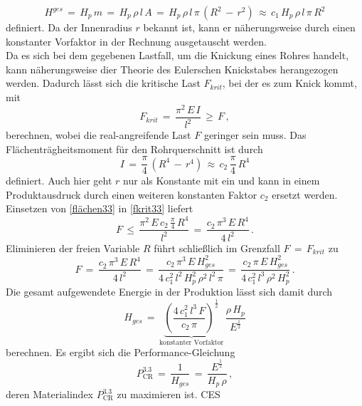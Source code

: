 \begin{equation}\label{energie33}
H^{ges}\,=\,H_p\,m\,=\,H_p\,\rho\,l\,A\,=\,H_p\,\rho\,l\,\pi\,\left(R^2\,-\,r^2\right)\,\approx\,c_1\,H_p\,\rho\,l\,\pi\,R^2
\end{equation}
definiert. Da der Innenradius $r$ bekannt ist, kann er näherungsweise durch einen konstanter Vorfaktor in der Rechnung ausgetauscht werden.\\
Da es sich bei dem gegebenen Lastfall, um die Knickung eines Rohres handelt, kann näherungsweise dier Theorie des Eulerschen Knickstabes herangezogen werden. Dadurch lässt sich die kritische Last $F_{krit}$, bei der es zum Knick kommt, mit
\begin{equation}\label{fkrit33}
F_{krit}\,=\,\frac{\pi^2\,E\,I}{l^2}\,\ge\,F\,,
\end{equation}
berechnen, wobei die real-angreifende Last $F$ geringer sein muss.
Das Flächenträgheitsmoment für den Rohrquerschnitt ist durch
\begin{equation}\label{flächen33}
I\,=\,\frac{\pi}{4}\,\left(R^4\,-\,r^4\right)\,\approx\,c_2\,\frac{\pi}{4}\,R^4
\end{equation}
definiert. Auch hier geht $r$ nur als Konstante mit ein und kann in einem Produktausdruck durch einen weiteren konstanten Faktor $c_2$ ersetzt werden. Einsetzen von \ref{flächen33} in \ref{fkrit33} liefert
\begin{equation}
F\,\le\,\frac{\pi^2\,E\,c_2\,\frac{\pi}{4}\,R^4}{l^2}\,=\,\frac{c_2\,\pi^3\,E\,R^4}{4\,l^2}\,.
\end{equation}
Eliminieren der freien Variable $R$ führt schließlich im Grenzfall $F\,=\,F_{krit}$ zu
\begin{equation}
F\,=\,\frac{c_2\,\pi^3\,E\,R^4}{4\,l^2}\,=\,\frac{c_2\,\pi^3\,E\,H_{ges}^2}{4\,c_1^2\,l^2\,H_p^2\,\rho^2\,l^2\,\pi}\,=\,\frac{c_2\,\pi\,E\,H_{ges}^2}{4\,c_1^2\,l^3\,\rho^2\,H_p^2}\,.
\end{equation}
Die gesamt aufgewendete Energie in der Produktion lässt sich damit durch
\begin{equation}
H_{ges}\,=\,\underbrace{\left(\frac{4\,c_1^2\,l^3\,F}{c_2\,\pi}\right)^\frac{1}{2}}_{\text{konstanter Vorfaktor}}\,\frac{\rho\,H_p}{E^\frac{1}{2}}
\end{equation}
berechnen.
Es ergibt sich die Performance-Gleichung
\begin{equation} \label{zielfkt3}
P_{\text{CR}}^{3.3}\,=\,\frac{1}{H_{ges}}\,=\,\frac{E^\frac{1}{2}}{H_p\,\rho}\,,
\end{equation}
deren Materialindex $P_{\text{CR}}^{3.3}$ zu maximieren ist.
CES\\ 

